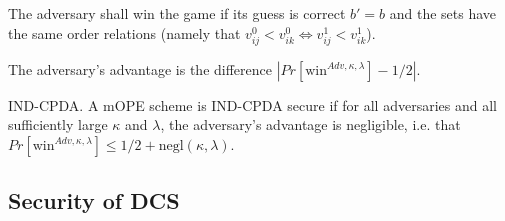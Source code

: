\documentclass[12pt]{article}
\newenvironment{definition}[1][Definition]{\begin{trivlist}
\item[\hskip \labelsep {\bfseries #1}]}{\end{trivlist}}
\begin{document}
The adversary shall win the game if its guess is correct $b' = b$ and the sets have the same order relations (namely that $v_{ij}^0 < v_{ik}^0 \Leftrightarrow v_{ij}^1 < v_{ik}^1$).

\begin{definition}
  The adversary's advantage is the difference $|Pr[\textrm{win}^{Adv, \kappa, \lambda}] - 1/2|$.
\end{definition}

\begin{definition}
  IND-CPDA. A mOPE scheme is IND-CPDA secure if for all adversaries and all sufficiently large $\kappa$ and $\lambda$, the adversary's advantage is negligible, i.e. that $Pr[\textrm{win}^{Adv, \kappa, \lambda}] \leq 1/2 + \textrm{negl}(\kappa, \lambda)$.
\end{definition}

\subsection{Security of DCS}
\end{document}
